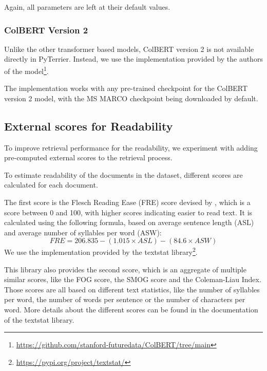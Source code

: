 Again, all parameters are left at their default values.

\subsubsection{ColBERT Version 2}
Unlike the other transformer based models, ColBERT version 2 is not available directly in PyTerrier.
Instead, we use the implementation provided by the authors of the model\footnote{\url{https://github.com/stanford-futuredata/ColBERT/tree/main}}.

The implementation works with any pre-trained checkpoint for the ColBERT version 2 model, with the MS MARCO checkpoint being downloaded by default.

\subsection{External scores for Readability}\label{sec:external-scores}
To improve retrieval performance for the readability, we experiment with adding pre-computed external scores to the retrieval process.

To estimate readability of the documents in the dataset, different scores are calculated for each document.

The first score is the Flesch Reading Ease (FRE) score devised by \cite{kincaid:1975:Derivation}, which is a score between 0 and 100, with higher scores indicating easier to read text.
It is calculated using the following formula, based on average sentence length (ASL) and average number of syllables per word (ASW):
\begin{equation}
    FRE = 206.835 - (1.015 \times ASL) - (84.6 \times ASW)
\end{equation}
We use the implementation provided by the textstat library\footnote{\url{https://pypi.org/project/textstat/}}.

This library also provides the second score, which is an aggregate of multiple similar scores, like the FOG score, the SMOG score and the Coleman-Liau Index.
Those scores are all based on different text statistics, like the number of syllables per word, the number of words per sentence or the number of characters per word.
More details about the different scores can be found in the documentation of the textstat library.

